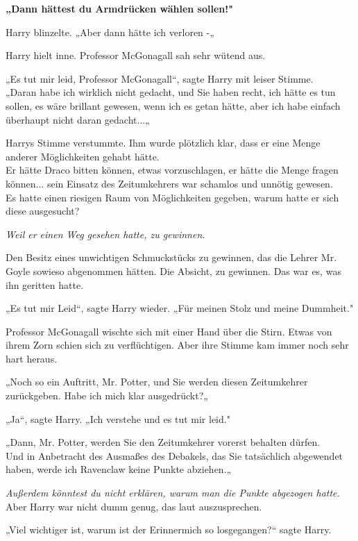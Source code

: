 {\textbf{„Dann hättest du Armdrücken wählen sollen!"}

Harry blinzelte. „Aber dann hätte ich verloren -„

Harry hielt inne. Professor McGonagall sah sehr wütend aus.

„Es tut mir leid, Professor McGonagall“, sagte Harry mit leiser Stimme.\\ „Daran habe ich wirklich nicht gedacht, und Sie haben recht, ich hätte es tun sollen, es wäre brillant gewesen, wenn ich es getan hätte, aber ich habe einfach überhaupt nicht daran gedacht...„

Harrys Stimme verstummte. Ihm wurde plötzlich klar, dass er eine Menge anderer Möglichkeiten gehabt hätte.\\ Er hätte Draco bitten können, etwas vorzuschlagen, er hätte die Menge fragen können... sein Einsatz des Zeitumkehrers war schamlos und unnötig gewesen.\\ Es hatte einen riesigen Raum von Möglichkeiten gegeben, warum hatte er sich diese ausgesucht?

\emph{Weil er einen Weg gesehen hatte, zu gewinnen.}

Den Besitz eines unwichtigen Schmuckstücks zu gewinnen, das die Lehrer Mr. Goyle sowieso abgenommen hätten. Die Absicht, zu gewinnen. Das war es, was ihn geritten hatte.

„Es tut mir Leid“, sagte Harry wieder. „Für meinen Stolz und meine Dummheit."

Professor McGonagall wischte sich mit einer Hand über die Stirn. Etwas von ihrem Zorn schien sich zu verflüchtigen. Aber ihre Stimme kam immer noch sehr hart heraus.

„Noch so ein Auftritt, Mr. Potter, und Sie werden diesen Zeitumkehrer zurückgeben. Habe ich mich klar ausgedrückt?„

„Ja“, sagte Harry. „Ich verstehe und es tut mir leid."

„Dann, Mr. Potter, werden Sie den Zeitumkehrer vorerst behalten dürfen.\\ Und in Anbetracht des Ausmaßes des Debakels, das Sie tatsächlich abgewendet haben, werde ich Ravenclaw keine Punkte abziehen.„

\emph{Außerdem könntest du nicht erklären, warum man die Punkte abgezogen hatte.}\\ Aber Harry war nicht dumm genug, das laut auszusprechen.

„Viel wichtiger ist, warum ist der Erinnermich so losgegangen?“ sagte Harry.

}
